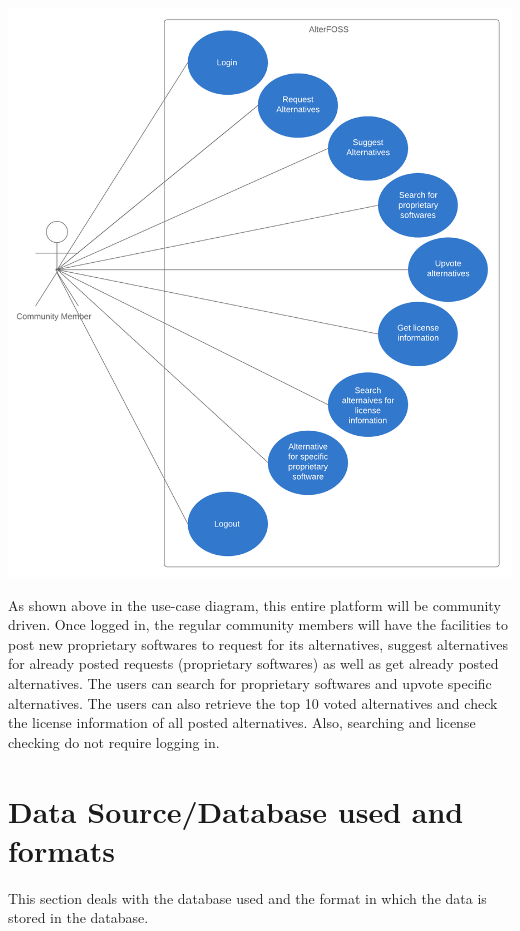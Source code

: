 \begin{center}
\includegraphics[scale=1]{images/uml_user.png} 
\end{center}

As shown above in the use-case diagram, this entire platform will be community driven. Once logged in, the regular community members will have the facilities to post new proprietary softwares to request for its alternatives, suggest alternatives for already posted requests (proprietary softwares) as well as get already posted alternatives. The users can search for proprietary softwares and upvote specific alternatives. The users can also retrieve the top 10 voted alternatives and check the license information of all posted alternatives. Also, searching and license checking do not require logging in.

\pagebreak

\section{Data Source/Database used and formats}

This section deals with the database used and the format in which the data is stored in the database.

